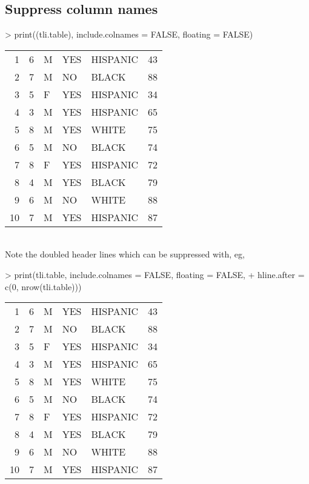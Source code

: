 \documentclass[letterpaper]{article}
\begin{document}
\subsection{Suppress column names}
\begin{Schunk}
\begin{Sinput}
> print((tli.table), include.colnames = FALSE, floating = FALSE)
\end{Sinput}
% latex table generated in R 2.6.0 by xtable 1.5-2 package
% Wed Oct 10 14:26:37 2007
\begin{tabular}{|rr|lp{3cm}l|r|}
  \hline
  \hline
1 & 6 & M & YES & HISPANIC & 43 \\
  2 &  7 & M & NO & BLACK & 88 \\
  3 &   5 & F & YES & HISPANIC &  34 \\
  4 &    3 & M & YES & HISPANIC &   65 \\
  5 &     8 & M & YES & WHITE &    75 \\
  6 & 5 & M & NO & BLACK & 74 \\
  7 &  8 & F & YES & HISPANIC & 72 \\
  8 &   4 & M & YES & BLACK &  79 \\
  9 &    6 & M & NO & WHITE &   88 \\
  10 &     7 & M & YES & HISPANIC &    87 \\
   \hline
\end{tabular}\end{Schunk}
\\
Note the doubled header lines which can be suppressed with, eg,
\begin{Schunk}
\begin{Sinput}
> print(tli.table, include.colnames = FALSE, floating = FALSE, 
+     hline.after = c(0, nrow(tli.table)))
\end{Sinput}
% latex table generated in R 2.6.0 by xtable 1.5-2 package
% Wed Oct 10 14:26:37 2007
\begin{tabular}{|rr|lp{3cm}l|r|}
   \hline
1 & 6 & M & YES & HISPANIC & 43 \\
  2 &  7 & M & NO & BLACK & 88 \\
  3 &   5 & F & YES & HISPANIC &  34 \\
  4 &    3 & M & YES & HISPANIC &   65 \\
  5 &     8 & M & YES & WHITE &    75 \\
  6 & 5 & M & NO & BLACK & 74 \\
  7 &  8 & F & YES & HISPANIC & 72 \\
  8 &   4 & M & YES & BLACK &  79 \\
  9 &    6 & M & NO & WHITE &   88 \\
  10 &     7 & M & YES & HISPANIC &    87 \\
   \hline
\end{tabular}\end{Schunk}
\end{document}
